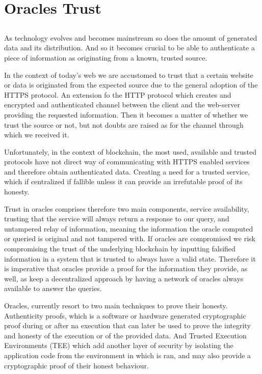 \chapter{Oracles Trust}\label{chap:chap4}

\section*{}
As technology evolves and becomes mainstream so does the amount of generated data and its distribution. And so it becomes crucial to be able to authenticate a piece of information as originating from a known, trusted source. 

In the context of today's web we are accustomed to trust that a certain website or data is originated from the expected source due to the general adoption of the HTTPS protocol. An extension fo the HTTP protocol which creates and encrypted and authenticated channel between the client and the web-server providing the requested information. Then it becomes a matter of whether we trust the source or not, but not doubts are raised as for the channel through which we received it.

Unfortunately, in the context of blockchain, the most used, available and trusted protocols have not direct way of communicating with HTTPS enabled services and therefore obtain authenticated data. Creating a need for a trusted service, which if centralized if fallible unless it can provide an irrefutable proof of its honesty. 

Trust in oracles comprises therefore two main components, service availability, trusting that the service will always return a response to our query, and untampered relay of information, meaning the information the oracle computed or queried is original and not tampered with. If oracles are compromised we risk compromising the trust of the underlying blockchain by inputting falsified information in a system that is trusted to always have a valid state. Therefore it is imperative that oracles provide a proof for the information they provide, as well, as keep a decentralized approach by having a network of oracles always available to answer the queries.

Oracles, currently resort to two main techniques to prove their honesty. Authenticity proofs, which is a software or hardware generated cryptographic proof during or after na execution that can later be used to prove the integrity and honesty of the execution or of the provided data. And Trusted Execution Environments (TEE) which add another layer of security by isolating the application code from the environment in which is ran, and may also provide a cryptographic proof of their honest behaviour.

